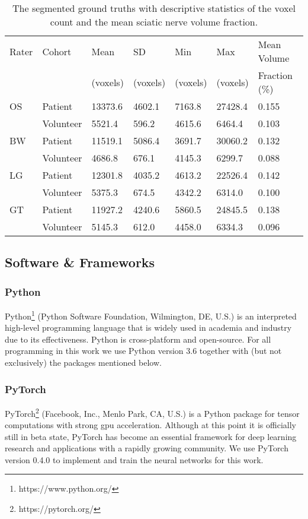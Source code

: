\begin{table}[htbp]
   \centering
   \caption[Descriptive Statistics of the Ground Truths]{The segmented ground truths with descriptive statistics of the voxel count and the mean sciatic nerve volume fraction.}
   \begin{tabular}{l*{6}{l}}
      \toprule
      Rater	& Cohort	& Mean		& SD		& Min		& Max		& Mean Volume	\\
      		&			& (voxels)	& (voxels)	& (voxels)	& (voxels)	& Fraction (\%)  \\
      \midrule
      OS  & Patient   & 13373.6 & 4602.1 & 7163.8 & 27428.4 & 0.155 \\
          & Volunteer & 5521.4  & 596.2  & 4615.6 & 6464.4  & 0.103 \\
      BW  & Patient   & 11519.1 & 5086.4 & 3691.7 & 30060.2 & 0.132 \\
          & Volunteer & 4686.8  & 676.1  & 4145.3 & 6299.7  & 0.088 \\
      LG  & Patient   & 12301.8 & 4035.2 & 4613.2 & 22526.4 & 0.142 \\
          & Volunteer & 5375.3  & 674.5  & 4342.2 & 6314.0  & 0.100 \\
      \midrule
	  GT  & Patient   & 11927.2 & 4240.6 & 5860.5 & 24845.5 & 0.138 \\
          & Volunteer & 5145.3  & 612.0  & 4458.0 & 6334.3  & 0.096 \\
      \bottomrule
   \end{tabular}
   \label{tab:ground_truths}
\end{table}


\subsection{Software \& Frameworks}
\subsubsection{Python}
Python\footnote{https://www.python.org/} (Python Software Foundation, Wilmington, DE, U.S.) is an interpreted high-level programming language that is widely used in academia and industry due to its effectiveness. Python is cross-platform and open-source. For all programming in this work we use Python version 3.6 together with (but not exclusively) the packages mentioned below.

\subsubsection{PyTorch}
PyTorch\footnote{https://pytorch.org/} (Facebook, Inc., Menlo Park, CA, U.S.) is a Python package for tensor computations with strong \gls{gpu} acceleration. Although at this point it is officially still in beta state, PyTorch has become an essential framework for deep learning research and applications with a rapidly growing community. We use PyTorch version 0.4.0 to implement and train the neural networks for this work.
